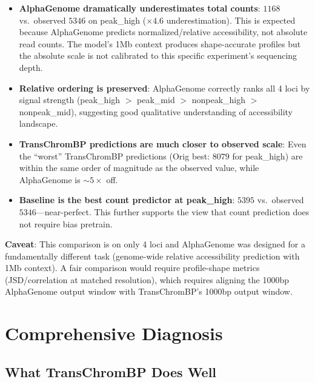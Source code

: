 \documentclass[11pt,a4paper]{article}
\begin{document}
\begin{itemize}
\item \textbf{AlphaGenome dramatically underestimates total counts}: $1168$ vs.\ observed $5346$ on peak\_high ($\times 4.6$ underestimation). This is expected because AlphaGenome predicts normalized/relative accessibility, not absolute read counts. The model's 1Mb context produces shape-accurate profiles but the absolute scale is not calibrated to this specific experiment's sequencing depth.

\item \textbf{Relative ordering is preserved}: AlphaGenome correctly ranks all 4 loci by signal strength (peak\_high $>$ peak\_mid $>$ nonpeak\_high $>$ nonpeak\_mid), suggesting good qualitative understanding of accessibility landscape.

\item \textbf{TransChromBP predictions are much closer to observed scale}: Even the ``worst'' TransChromBP predictions (Orig best: $8079$ for peak\_high) are within the same order of magnitude as the observed value, while AlphaGenome is $\sim 5\times$ off.

\item \textbf{Baseline is the best count predictor at peak\_high}: $5395$ vs.\ observed $5346$---near-perfect. This further supports the view that count prediction does not require bias pretrain.
\end{itemize}

\textbf{Caveat}: This comparison is on only 4 loci and AlphaGenome was designed for a fundamentally different task (genome-wide relative accessibility prediction with 1Mb context). A fair comparison would require profile-shape metrics (JSD/correlation at matched resolution), which requires aligning the 1000bp AlphaGenome output window with TransChromBP's 1000bp output window.

\section{Comprehensive Diagnosis}
\label{sec:diagnosis}

\subsection{What TransChromBP Does Well}
\end{document}
